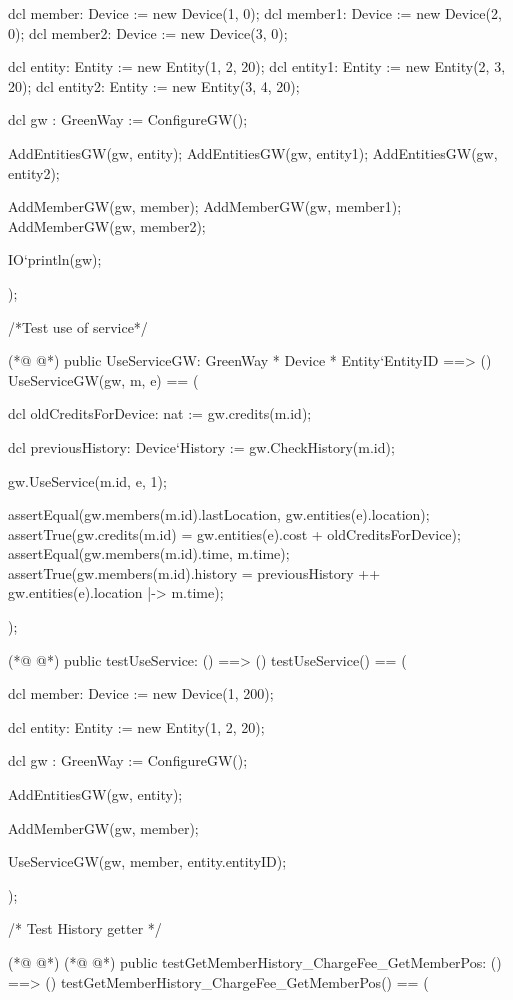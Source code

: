 \begin{vdmpp}
    dcl member: Device := new Device(1, 0);
    dcl member1: Device := new Device(2, 0);
    dcl member2: Device := new Device(3, 0);
    
    dcl entity: Entity := new Entity(1, 2, 20);
    dcl entity1: Entity := new Entity(2, 3, 20);
    dcl entity2: Entity := new Entity(3, 4, 20);
    
    dcl gw : GreenWay := ConfigureGW();
    
    AddEntitiesGW(gw, entity); 
    AddEntitiesGW(gw, entity1);
    AddEntitiesGW(gw, entity2);
    
    AddMemberGW(gw, member);
    AddMemberGW(gw, member1);
    AddMemberGW(gw, member2);
    
    IO`println(gw);
          
  );
  
  /*Test use of service*/  
  
(*@
\label{UseServiceGW:83}
@*)
  public UseServiceGW: GreenWay *  Device * Entity`EntityID ==> ()
  UseServiceGW(gw, m, e) == (
  
    dcl oldCreditsForDevice: nat := gw.credits(m.id);
    
    dcl previousHistory: Device`History := gw.CheckHistory(m.id);   
  
    gw.UseService(m.id, e, 1);
    
    assertEqual(gw.members(m.id).lastLocation, gw.entities(e).location);
    assertTrue(gw.credits(m.id) =  gw.entities(e).cost + oldCreditsForDevice);
    assertEqual(gw.members(m.id).time, m.time);
    assertTrue(gw.members(m.id).history = previousHistory ++ {gw.entities(e).location |-> m.time});  
    
    );
    
(*@
\label{testUseService:99}
@*)
  public testUseService: () ==> ()
  testUseService() == (
  
    dcl member: Device := new Device(1, 200);
    
    dcl entity: Entity := new Entity(1, 2, 20);
    
    dcl gw : GreenWay := ConfigureGW();
    
    AddEntitiesGW(gw, entity); 
    
    AddMemberGW(gw, member);    

    UseServiceGW(gw, member, entity.entityID); 
    
      
  );
  
  /* Test History getter */
  
(*@
\label{getMemberHistory:119}
@*)
(*@
\label{testGetMemberHistory:ChargeFee:GetMemberPos:119}
@*)
   public testGetMemberHistory_ChargeFee_GetMemberPos: () ==> ()
   testGetMemberHistory_ChargeFee_GetMemberPos() == (
   

\end{vdmpp}
